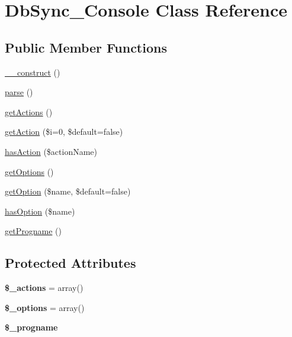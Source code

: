 \hypertarget{classDbSync__Console}{
\section{DbSync\_\-Console Class Reference}
\label{classDbSync__Console}
}
\subsection*{Public Member Functions}
\begin{DoxyCompactItemize}
\item 
\hyperlink{classDbSync__Console_a48f8b7f7a75ac1d131f2906d38aa1206}{\_\-\_\-construct} ()
\item 
\hyperlink{classDbSync__Console_a3dd99beadb7079e4b06176b01eb0a605}{parse} ()
\item 
\hyperlink{classDbSync__Console_ae3a3b1fa95270c903c4931203f1375e7}{getActions} ()
\item 
\hyperlink{classDbSync__Console_a5775849f51edee7680d471f568672d00}{getAction} (\$i=0, \$default=false)
\item 
\hyperlink{classDbSync__Console_a3703fb3e10405ababc47e0e0726626e9}{hasAction} (\$actionName)
\item 
\hyperlink{classDbSync__Console_a2f57c2eae9dacb2b70daab96257ababc}{getOptions} ()
\item 
\hyperlink{classDbSync__Console_a2756cbe1cb5462f68f732ce516ebb5cf}{getOption} (\$name, \$default=false)
\item 
\hyperlink{classDbSync__Console_a9d30dd54d87a3789f8e191ed3b98cee2}{hasOption} (\$name)
\item 
\hyperlink{classDbSync__Console_a36679ad0b0081b447ece2da9fbec7559}{getProgname} ()
\end{DoxyCompactItemize}
\subsection*{Protected Attributes}
\begin{DoxyCompactItemize}
\item 
\hypertarget{classDbSync__Console_a1e86fee147c38c22b92db0fcfcdd4334}{
{\bfseries \$\_\-actions} = array()}
\label{classDbSync__Console_a1e86fee147c38c22b92db0fcfcdd4334}

\item 
\hypertarget{classDbSync__Console_af6e6bb3ef560797607b8334304aaf5a6}{
{\bfseries \$\_\-options} = array()}
\label{classDbSync__Console_af6e6bb3ef560797607b8334304aaf5a6}

\item 
\hypertarget{classDbSync__Console_aba71dafddfd722dc06032c278d617876}{
{\bfseries \$\_\-progname}}
\label{classDbSync__Console_aba71dafddfd722dc06032c278d617876}

\end{DoxyCompactItemize}


